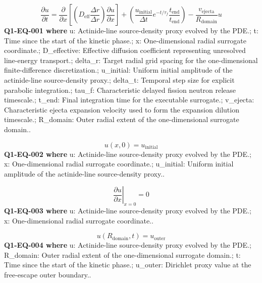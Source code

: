 \documentclass[11pt]{article}
\begin{document}
\begin{equation}\label{eq:Q1-EQ-001}
\frac{\partial u}{\partial t} = \frac{\partial}{\partial x}\left[ \left(D_{\mathrm{eff}}\frac{\Delta r}{\Delta r}\right) \frac{\partial u}{\partial x}\right] + \left(\frac{u_{\mathrm{initial}}}{\Delta t} e^{-t/\tau_f} \frac{t_{\mathrm{end}}}{t_{\mathrm{end}}}\right) - \frac{v_{\mathrm{ejecta}}}{R_{\mathrm{domain}}} u
\end{equation}
\noindent\textbf{Q1-EQ-001 where} u: Actinide-line source-density proxy evolved by the PDE.; t: Time since the start of the kinetic phase.; x: One-dimensional radial surrogate coordinate.; D\_effective: Effective diffusion coefficient representing unresolved line-energy transport.; delta\_r: Target radial grid spacing for the one-dimensional finite-difference discretization.; u\_initial: Uniform initial amplitude of the actinide-line source-density proxy.; delta\_t: Temporal step size for explicit parabolic integration.; tau\_f: Characteristic delayed fission neutron release timescale.; t\_end: Final integration time for the executable surrogate.; v\_ejecta: Characteristic ejecta expansion velocity used to form the expansion dilution timescale.; R\_domain: Outer radial extent of the one-dimensional surrogate domain..

\begin{equation}\label{eq:Q1-EQ-002}
u(x,0) = u_{\mathrm{initial}}
\end{equation}
\noindent\textbf{Q1-EQ-002 where} u: Actinide-line source-density proxy evolved by the PDE.; x: One-dimensional radial surrogate coordinate.; u\_initial: Uniform initial amplitude of the actinide-line source-density proxy..

\begin{equation}\label{eq:Q1-EQ-003}
\left.\frac{\partial u}{\partial x}\right|_{x=0} = 0
\end{equation}
\noindent\textbf{Q1-EQ-003 where} u: Actinide-line source-density proxy evolved by the PDE.; x: One-dimensional radial surrogate coordinate..

\begin{equation}\label{eq:Q1-EQ-004}
u(R_{\mathrm{domain}},t) = u_{\mathrm{outer}}
\end{equation}
\noindent\textbf{Q1-EQ-004 where} u: Actinide-line source-density proxy evolved by the PDE.; R\_domain: Outer radial extent of the one-dimensional surrogate domain.; t: Time since the start of the kinetic phase.; u\_outer: Dirichlet proxy value at the free-escape outer boundary..
\end{document}
